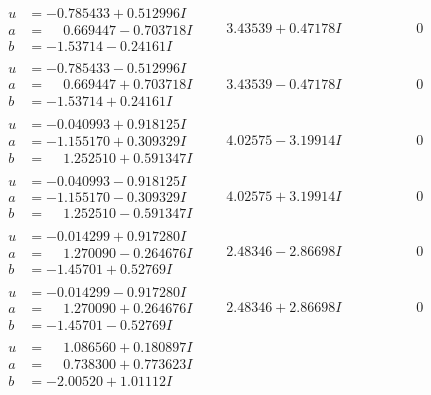 \documentclass[1p]{elsarticle_modified}
\theoremstyle{definition}
\begin{document}
$$\begin{array}{c|c|c}
\begin{aligned}
u &= -0.785433 + 0.512996 I \\
a &= \phantom{-}0.669447 - 0.703718 I \\
b &= -1.53714 - 0.24161 I\end{aligned}
 & \phantom{-}3.43539 + 0.47178 I & \phantom{-0.000000 } 0 \\ \hline\begin{aligned}
u &= -0.785433 - 0.512996 I \\
a &= \phantom{-}0.669447 + 0.703718 I \\
b &= -1.53714 + 0.24161 I\end{aligned}
 & \phantom{-}3.43539 - 0.47178 I & \phantom{-0.000000 } 0 \\ \hline\begin{aligned}
u &= -0.040993 + 0.918125 I \\
a &= -1.155170 + 0.309329 I \\
b &= \phantom{-}1.252510 + 0.591347 I\end{aligned}
 & \phantom{-}4.02575 - 3.19914 I & \phantom{-0.000000 } 0 \\ \hline\begin{aligned}
u &= -0.040993 - 0.918125 I \\
a &= -1.155170 - 0.309329 I \\
b &= \phantom{-}1.252510 - 0.591347 I\end{aligned}
 & \phantom{-}4.02575 + 3.19914 I & \phantom{-0.000000 } 0 \\ \hline\begin{aligned}
u &= -0.014299 + 0.917280 I \\
a &= \phantom{-}1.270090 - 0.264676 I \\
b &= -1.45701 + 0.52769 I\end{aligned}
 & \phantom{-}2.48346 - 2.86698 I & \phantom{-0.000000 } 0 \\ \hline\begin{aligned}
u &= -0.014299 - 0.917280 I \\
a &= \phantom{-}1.270090 + 0.264676 I \\
b &= -1.45701 - 0.52769 I\end{aligned}
 & \phantom{-}2.48346 + 2.86698 I & \phantom{-0.000000 } 0 \\ \hline\begin{aligned}
u &= \phantom{-}1.086560 + 0.180897 I \\
a &= \phantom{-}0.738300 + 0.773623 I \\
b &= -2.00520 + 1.01112 I\end{aligned}

\end{array}$$
\end{document}
